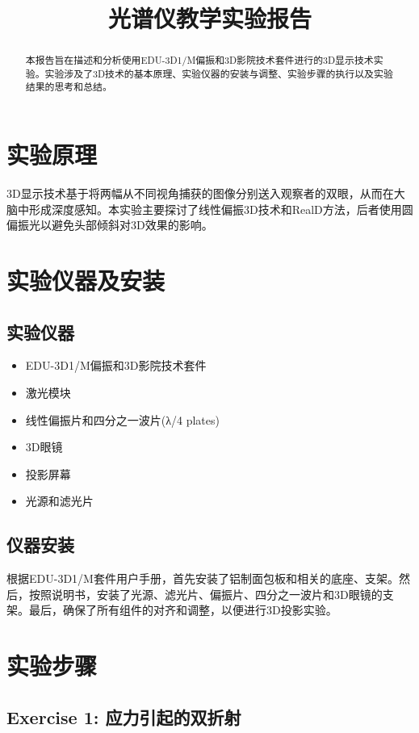 \documentclass{ctexart}
\title{光谱仪教学实验报告}
\begin{document}
\maketitle

\begin{abstract}
本报告旨在描述和分析使用EDU-3D1/M偏振和3D影院技术套件进行的3D显示技术实验。实验涉及了3D技术的基本原理、实验仪器的安装与调整、实验步骤的执行以及实验结果的思考和总结。
\end{abstract}

\section{实验原理}
3D显示技术基于将两幅从不同视角捕获的图像分别送入观察者的双眼，从而在大脑中形成深度感知。本实验主要探讨了线性偏振3D技术和RealD方法，后者使用圆偏振光以避免头部倾斜对3D效果的影响。

\section{实验仪器及安装}
\subsection{实验仪器}
\begin{itemize}
    \item EDU-3D1/M偏振和3D影院技术套件
    \item 激光模块
    \item 线性偏振片和四分之一波片(λ/4 plates)
    \item 3D眼镜
    \item 投影屏幕
    \item 光源和滤光片
\end{itemize}
\subsection{仪器安装}
根据EDU-3D1/M套件用户手册，首先安装了铝制面包板和相关的底座、支架。然后，按照说明书，安装了光源、滤光片、偏振片、四分之一波片和3D眼镜的支架。最后，确保了所有组件的对齐和调整，以便进行3D投影实验。

\section{实验步骤}
\subsection{Exercise 1: 应力引起的双折射}
\end{document}
